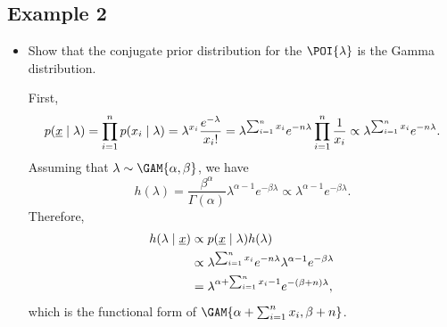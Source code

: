 \subsection*{Example 2}
\begin{itemize}
      \item Show that the conjugate prior distribution for the $ \POI{\lambda} $ is the Gamma distribution.
            \begin{framed}
                  First,
                  \[ p(\underline{x}\mid \lambda)=\prod_{i=1}^n p(x_i\mid \lambda)=\lambda^{x_i}\frac{e^{-\lambda}}{x_i!}
                        =\lambda^{\sum_{i=1}^{n}x_i}e^{-n\lambda}\prod_{i=1}^n \frac{1}{x_i}\propto \lambda^{\sum_{i=1}^{n}x_i}e^{-n\lambda}. \]
                  Assuming that $ \lambda \sim \GAM{\alpha,\beta} $, we have
                  \[ h(\lambda)=\frac{\beta^\alpha}{\Gamma(\alpha)}\lambda^{\alpha-1}e^{-\beta\lambda}\propto \lambda^{\alpha-1}e^{-\beta\lambda}. \]
                  Therefore,
                  \begin{align*}
                        h(\lambda\mid \underline{x})
                         & \propto p(\underline{x}\mid \lambda)h(\lambda)                                         \\
                         & \propto \lambda^{\sum_{i=1}^{n}x_i}e^{-n\lambda}\lambda^{\alpha-1}e^{-\beta\lambda} \\
                         & =\lambda^{\alpha+\sum_{i=1}^{n}x_i-1}e^{-(\beta+n)\lambda},
                  \end{align*}
                  which is the functional form of $ \GAM{\alpha+\sum_{i=1}^{n}x_i,\beta+n} $.
            \end{framed}
\end{itemize}
